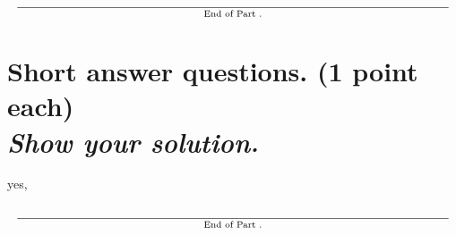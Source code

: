 \documentclass[noquestionbreak]{../skrexam}  %
\begin{document}
\[
\underset{%
	\text{End of \thesection}%
	}{%
	\text{\underline{\hspace{\textwidth}}}%
}
\]


\newpage
\section{Short answer questions. (1 point each)%
\protect\\%
\textit{\small Show your solution.}%
}

\begin{shortanswers}
\question
 yes,

\end{shortanswers}

\[
\underset{%
	\text{End of \thesection}%
	}{%
	\text{\underline{\hspace{\textwidth}}}%
}
\]

\setcounter{totalpages}{\value{page}}
\setcounter{totalsections}{\value{section}}
\end{document}
